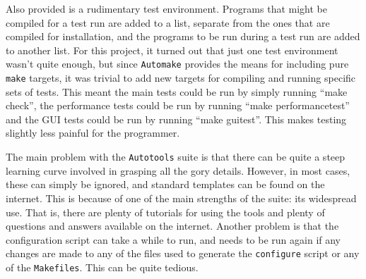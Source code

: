 Also provided is a rudimentary test environment.
Programs that might be compiled for a test run are added to a list,
separate from the ones that are compiled for installation,
and the programs to be run during a test run are added to another list.
For this project, it turned out that just one test environment
wasn't quite enough, but since \texttt{Automake} provides
the means for including pure \texttt{make} targets, it was trivial
to add new targets for compiling and running specific sets of tests.
This meant the main tests could be run by simply running
``make check'', the performance tests could be run by running
``make performancetest'' and the GUI tests could be run by running
``make guitest''.
This makes testing slightly less painful for the programmer.

The main problem with the \texttt{Autotools} suite is that there can be
quite a steep learning curve involved in grasping all the gory details.
However, in most cases, these can simply be ignored, and standard
templates can be found on the internet.
This is because of one of the main strengths of the suite: its widespread
use.
That is, there are plenty of tutorials for using the tools and plenty
of questions and answers available on the internet.
Another problem is that the configuration script can take a while to
run, and needs to be run again if any changes are made to any of the
files used to generate the \texttt{configure} script or any of the
\texttt{Makefiles}.
This can be quite tedious.
